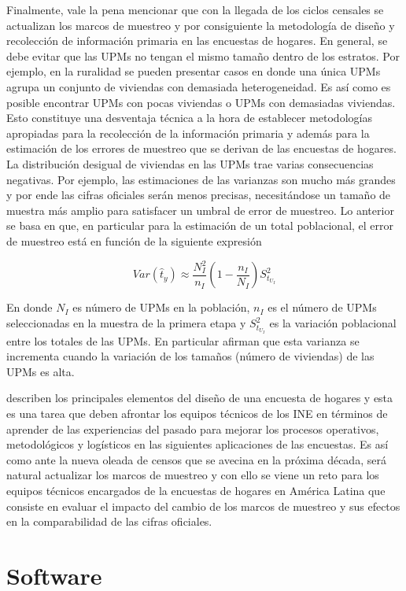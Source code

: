 \documentclass[
  12pt,
  spanish,
]{book}
\begin{document}
Finalmente, vale la pena mencionar que con la llegada de los ciclos censales se actualizan los marcos de muestreo y por consiguiente la metodología de diseño y recolección de información primaria en las encuestas de hogares. En general, se debe evitar que las UPMs no tengan el mismo tamaño dentro de los estratos. Por ejemplo, en la ruralidad se pueden presentar casos en donde una única UPMs agrupa un conjunto de viviendas con demasiada heterogeneidad. Es así como es posible encontrar UPMs con pocas viviendas o UPMs con demasiadas viviendas. Esto constituye una desventaja técnica a la hora de establecer metodologías apropiadas para la recolección de la información primaria y además para la estimación de los errores de muestreo que se derivan de las encuestas de hogares. La distribución desigual de viviendas en las UPMs trae varias consecuencias negativas. Por ejemplo, las estimaciones de las varianzas son mucho más grandes y por ende las cifras oficiales serán menos precisas, necesitándose un tamaño de muestra más amplio para satisfacer un umbral de error de muestreo. Lo anterior se basa en que, en particular para la estimación de un total poblacional, el error de muestreo está en función de la siguiente expresión

\[Var(\hat{t}_y) \approx \frac{N_I^2}{n_I}\left(1-\frac{n_I}{N_I}\right)S^2_{t_{U_I}} \]

En donde \(N_I\) es número de UPMs en la población, \(n_I\) es el número de UPMs seleccionadas en la muestra de la primera etapa y \(S^2_{t_{U_I}}\) es la variación poblacional entre los totales de las UPMs. En particular \citet[pág. 144]{Sarndal_Swensson_Wretman_2003} afirman que esta varianza se incrementa cuando la variación de los tamaños (número de viviendas) de las UPMs es alta.

\citet{Beland_Dale_Dufour_Hamel_2005} describen los principales elementos del diseño de una encuesta de hogares y esta es una tarea que deben afrontar los equipos técnicos de los INE en términos de aprender de las experiencias del pasado para mejorar los procesos operativos, metodológicos y logísticos en las siguientes aplicaciones de las encuestas. Es así como ante la nueva oleada de censos que se avecina en la próxima década, será natural actualizar los marcos de muestreo y con ello se viene un reto para los equipos técnicos encargados de la encuestas de hogares en América Latina que consiste en evaluar el impacto del cambio de los marcos de muestreo y sus efectos en la comparabilidad de las cifras oficiales.

\hypertarget{software}{%
\chapter{Software}\label{software}}
\end{document}
